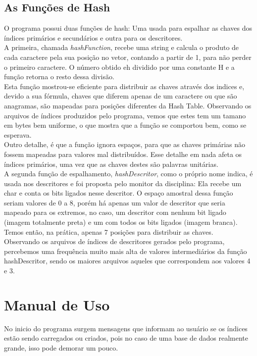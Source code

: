 \documentclass[10pt,a4paper,draft]{article}
\begin{document}
\newpage 
\subsection{As Funções de Hash}
O programa possui duas funções de hash: Uma usada para espalhar as chaves dos índices 
primários e secundários e outra para os descritores.
\\

A primeira, chamada \textit{hashFunction}, recebe uma string e calcula o produto de cada caractere pela sua posição no vetor, contando a partir de 1, para não perder o primeiro caractere. O número obtido eh dividido por uma constante H e a função retorna o resto dessa divisão.
\\

Esta função mostrou-se eficiente para distribuir as chaves através dos indices e, devido a sua fórmula, chaves que diferem apenas de um caractere ou que são anagramas, são mapeadas para posições diferentes da Hash Table. Observando os arquivos de índices produzidos pelo programa, vemos que estes tem um tamano em bytes bem uniforme, o que mostra que a função se comportou bem, como se esperava.
\\

Outro detalhe, é que a função ignora espaços, para que as chaves primárias não fossem mapeadas para valores mal distribuídos. Esse detalhe em nada afeta os índices primários, uma vez que as chaves destes são palavras unitárias.
\\

A segunda função de espalhamento, \textit{hashDescritor}, como o próprio nome indica, é usada nos descritores e foi proposta pelo monitor da disciplina: Ela recebe um char e conta os bits ligados nesse descritor. O espaço amostral dessa função seriam valores de 0 a 8, porém há apenas um valor de descritor que seria mapeado para os extremos, no caso, um descritor com nenhum bit ligado (imagem totalmente preta) e um com todos os bits ligados (imagem branca). Temos então, na prática, apenas 7 posições para distribuir as chaves.
\\

Observando os arquivos de índices de descritores gerados pelo programa, percebemos uma frequência muito mais alta de valores intermediários da função hashDescritor, sendo os maiores arquivos aqueles que correspondem aos valores 4 e 3.

\newpage 
\section{Manual de Uso}
No inicio do programa surgem mensagens que informam ao usuário se os índices estão sendo carregados ou criados, pois no caso de uma base de dados realmente grande, isso pode demorar um pouco.
\end{document}
